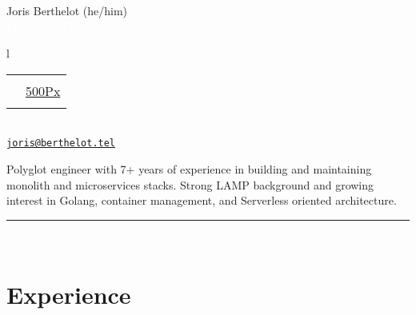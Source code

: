 \documentclass[letterpaper]{article}
\def\name{Joris Berthelot}
\def\title{Enthusiast Cloud Native Engineer}
\def\linkedinurl{https://www.linkedin.com/in/eexit}
\def\githuburl{https://github.com/eexit}
\def\twitterurl{https://www.twitter.com/JorisBerthelot}
\def\portfoliourl{https://joris.berthelot.photography}
\def\instagramurl{https://instagram.com/eexit}
\def\500pxurl{https://500px.com/eexit}
\begin{document}
    \vspace{0.25in}

    \begin{minipage}{0.80\linewidth}
        {\Huge \name} {\small (he/him)} \\[0.5cm]
        \setlength\fboxsep{10pt}
        \colorbox{almostblack}{\Large \textcolor{white}{\title}}
    \end{minipage}
    \begin{minipage}{\linewidth}
        \begin{tabular}{l}
            \begin{tabular}{ll}
                \href{\linkedinurl}{{\textcolor[RGB]{0,123,181}\faLinkedinSquare}} & \href{\instagramurl}{\faInstagram} \\[0.1cm]
                \href{\githuburl}{\faGithub} & \href{\500pxurl}{\fa500Px} \\[0.1cm]
                \href{\twitterurl}{{\textcolor[RGB]{85,172,238}\faTwitter}} & \href{\portfoliourl}{\faCameraRetro}
            \end{tabular}
        \end{tabular}
        \\[0.3cm]
        \href{mailto:joris@berthelot.tel}{\tt joris@berthelot.tel}
    \end{minipage}

    \vspace{1.5cm}

    Polyglot engineer with 7+ years of experience in building and maintaining monolith and microservices stacks. Strong LAMP background and growing interest in Golang, container management, and Serverless oriented architecture.\\

    \noindent\rule{\textwidth}{1pt}\\

    \section*{\faCubes{} Experience}
\end{document}
